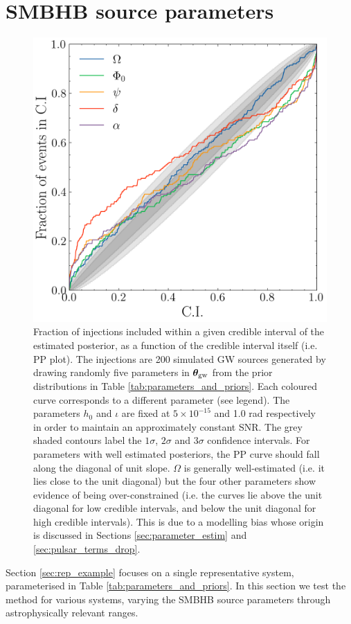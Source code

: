 \documentclass[fleqn,usenatbib,useAMS]{mnras}
\begin{document}
\section{SMBHB source parameters} \label{sec:parameter_space}
\begin{figure}
	\centering
	\includegraphics[width=\columnwidth]{images/pp_plot_new1}
	\caption{Fraction of injections included within a given credible interval of the estimated posterior, as a function of the credible interval itself (i.e. PP plot). The injections are 200 simulated GW sources generated by drawing randomly five parameters in $\boldsymbol{\theta}_{\rm gw}$ from the prior distributions in Table \ref{tab:parameters_and_priors}. Each coloured curve corresponds to a different parameter (see legend). The parameters $h_0$ and $\iota$ are fixed at $5 \times 10^{-15}$ and 1.0 rad respectively in order to maintain an approximately constant SNR. The grey shaded contours label the $1\sigma$, $2\sigma$ and 3$\sigma$ confidence intervals. For parameters with well estimated posteriors, the PP curve should fall along the diagonal of unit slope. $\Omega$ is generally well-estimated (i.e. it lies close to the unit diagonal) but the four other parameters show evidence of being over-constrained (i.e. the curves lie above the unit diagonal for low credible intervals, and below the unit diagonal for high credible intervals). This is due to a modelling bias whose origin is discussed in Sections \ref{sec:parameter_estim} and \ref{sec:pulsar_terms_drop}.}
	\label{fig:parameter_space}
\end{figure}
Section \ref{sec:rep_example} focuses on a single representative system, parameterised in Table \ref{tab:parameters_and_priors}. In this section we test the method for various systems, varying the SMBHB source parameters through astrophysically relevant ranges. \newline 
\end{document}
